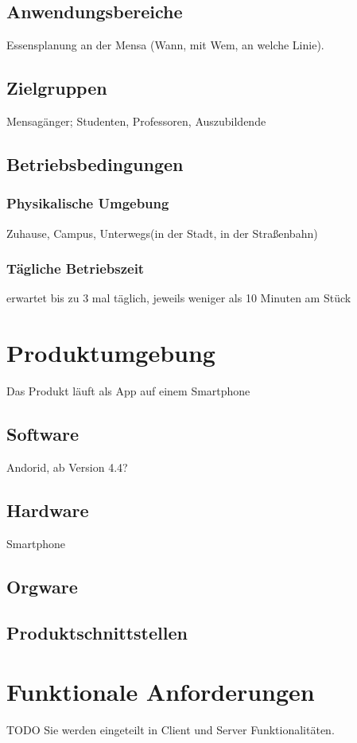 \documentclass[a4paper]{scrreprt}
\begin{document}
 
\section{Anwendungsbereiche}
Essensplanung an der Mensa (Wann, mit Wem, an welche Linie).
 
\section{Zielgruppen}
Mensagänger; Studenten, Professoren, Auszubildende 
 
\section{Betriebsbedingungen}
\subsection{Physikalische Umgebung}
Zuhause, Campus, Unterwegs(in der Stadt, in der Straßenbahn)

\subsection{Tägliche Betriebszeit}
erwartet bis zu 3 mal täglich, jeweils weniger als 10 Minuten am Stück 
 
\chapter{Produktumgebung}
Das Produkt läuft als App auf einem Smartphone

\section{Software}
Andorid, ab Version 4.4?
 
\section{Hardware}
Smartphone 
 
\section{Orgware}

\section{Produktschnittstellen} 
 
\chapter{Funktionale Anforderungen}
TODO Sie werden eingeteilt in Client und Server Funktionalitäten.
\end{document}
